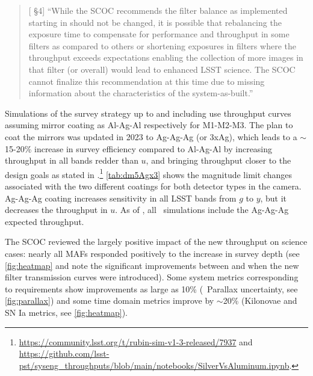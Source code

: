  \begin{quote}
    {[ \S4] ``While the SCOC recommends the filter balance as implemented starting in  should not be changed, it is possible that rebalancing the exposure time to compensate for performance and throughput in some filters as compared to others or shortening exposures in filters where the throughput exceeds expectations enabling the collection of more images in that filter (or overall) would lead to enhanced LSST science. The SCOC cannot finalize this recommendation at this time due to missing information about the characteristics of the system-as-built.''}
\end{quote}

Simulations of the survey strategy up to and including  use throughput curves assuming mirror coating as Al-Ag-Al respectively for M1-M2-M3. The plan to coat the mirrors was updated in 2023 to Ag-Ag-Ag (or 3xAg), which leads to a \mbox{$\sim$15-20\%} increase in survey efficiency compared to Al-Ag-Al by increasing throughput in all bands redder than $u$, and bringing throughput closer to the design goals as stated in .\footnote{\url{https://community.lsst.org/t/rubin-sim-v1-3-released/7937} and \url{https://github.com/lsst-pst/syseng_throughputs/blob/main/notebooks/SilverVsAluminum.ipynb}.}  \autoref{tab:dm5Agx3} shows the magnitude limit changes associated with the two different coatings for both detector types in the camera.  Ag-Ag-Ag coating increases sensitivity in all LSST bands from $g$ to $y$, but it decreases the throughput in $u$.  As of , all \opsim\ simulations include the Ag-Ag-Ag expected throughput.

The SCOC reviewed the largely positive impact of the new throughput on science cases: nearly all MAFs responded positively to the increase in survey depth (see \autoref{fig:heatmap} and note the significant improvements between  and  when the new filter transmission curves were introduced). Some system metrics corresponding to  requirements show improvements as large as 10\% (\eg\ Parallax uncertainty, see \autoref{fig:parallax}) and some time domain metrics improve by \mbox{$\sim$20\%} (Kilonovae and SN Ia metrics, see \autoref{fig:heatmap}). 
\clearpage

